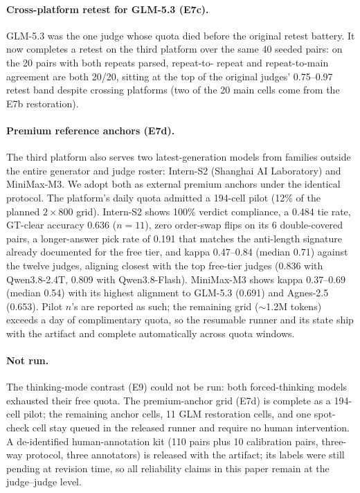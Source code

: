 \documentclass[review,12pt]{elsarticle}
\begin{document}
\paragraph{Cross-platform retest for GLM-5.3 (E7c).}
GLM-5.3 was the one judge whose quota died before the original retest
battery. It now completes a retest on the third platform over the same
40 seeded pairs: on the 20 pairs with both repeats parsed, repeat-to-
repeat and repeat-to-main agreement are both 20/20, sitting at the top of
the original judges' 0.75--0.97 retest band despite crossing platforms
(two of the 20 main cells come from the E7b restoration).

\paragraph{Premium reference anchors (E7d).}
The third platform also serves two latest-generation models from
families outside the entire generator and judge roster: Intern-S2
(Shanghai AI Laboratory) and MiniMax-M3. We adopt both as external
premium anchors under the identical protocol. The platform's daily quota admitted a
194-cell pilot (12\% of the planned $2\times800$ grid). Intern-S2 shows
100\% verdict compliance, a 0.484 tie rate, GT-clear accuracy 0.636
($n=11$), zero order-swap flips on its 6 double-covered pairs, a
longer-answer pick rate of 0.191 that matches the anti-length signature
already documented for the free tier, and kappa 0.47--0.84 (median 0.71)
against the twelve judges, aligning closest with the top free-tier
judges (0.836 with Qwen3.8-2.4T, 0.809 with Qwen3.8-Flash). MiniMax-M3
shows kappa 0.37--0.69 (median 0.54) with its highest alignment to
GLM-5.3 (0.691) and Agnes-2.5 (0.653). Pilot $n$'s are reported as
such; the remaining grid ($\sim$1.2M tokens) exceeds a day of
complimentary quota, so the resumable runner and its state ship with the
artifact and complete automatically across quota windows.

\paragraph{Not run.}
The thinking-mode contrast (E9) could not be run: both forced-thinking
models exhausted their free quota. The premium-anchor grid (E7d) is
complete as a 194-cell pilot; the remaining anchor cells, 11 GLM
restoration cells, and one spot-check cell stay queued in the released
runner and require no human intervention. A de-identified
human-annotation kit (110 pairs plus 10 calibration pairs, three-way
protocol, three annotators) is released with the artifact; its labels
were still pending at revision time, so all reliability claims in this
paper remain at the judge--judge level.
\end{document}
